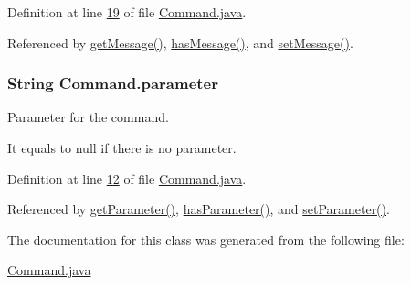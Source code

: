 Definition at line \hyperlink{Command_8java_source_l00019}{19} of file \hyperlink{Command_8java_source}{Command.\-java}.



Referenced by \hyperlink{Command_8java_source_l00057}{get\-Message()}, \hyperlink{Command_8java_source_l00065}{has\-Message()}, and \hyperlink{Command_8java_source_l00049}{set\-Message()}.

\hypertarget{classCommand_a02ad27e4576737c16cd78f708188bb54}{
\subsubsection[{parameter}]{\setlength{\rightskip}{0pt plus 5cm}String Command.\-parameter\hspace{0.3cm}{\ttfamily [private]}}}\label{classCommand_a02ad27e4576737c16cd78f708188bb54}


Parameter for the command. 

It equals to null if there is no parameter. 

Definition at line \hyperlink{Command_8java_source_l00012}{12} of file \hyperlink{Command_8java_source}{Command.\-java}.



Referenced by \hyperlink{Command_8java_source_l00025}{get\-Parameter()}, \hyperlink{Command_8java_source_l00041}{has\-Parameter()}, and \hyperlink{Command_8java_source_l00033}{set\-Parameter()}.



The documentation for this class was generated from the following file\-:\begin{DoxyCompactItemize}
\item 
\hyperlink{Command_8java}{Command.\-java}\end{DoxyCompactItemize}
